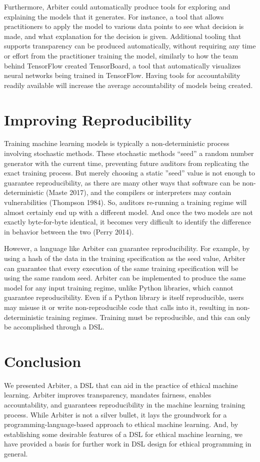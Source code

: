 \documentclass[letterpaper]{article}
\begin{document}
Furthermore, Arbiter could automatically produce tools for exploring and explaining the models that it generates. For instance, a tool that allows practitioners to apply the model to various data points to see what decision is made, and what explanation for the decision is given. Additional tooling that supports transparency can be produced automatically, without requiring any time or effort from the practitioner training the model, similarly to how the team behind TensorFlow created TensorBoard, a tool that automatically visualizes neural networks being trained in TensorFlow. Having tools for accountability readily available will increase the average accountability of models being created.

\section{Improving Reproducibility}
Training machine learning models is typically a non-deterministic process involving stochastic methods. These stochastic methods ``seed” a random number generator with the current time, preventing future auditors from replicating the exact training process. But merely choosing a static ''seed” value is not enough to guarantee reproducibility, as there are many other ways that software can be non-deterministic (Maste 2017), and the compilers or interpreters may contain vulnerabilities (Thompson 1984). So, auditors re-running a training regime will almost certainly end up with a different model. And once the two models are not exactly byte-for-byte identical, it becomes very difficult to identify the difference in behavior between the two (Perry 2014).

However, a language like Arbiter can guarantee reproducibility. For example, by using a hash of the data in the training specification as the seed value, Arbiter can guarantee that every execution of the same training specification will be using the same random seed. Arbiter can be implemented to produce the same model for any input training regime, unlike Python libraries, which cannot guarantee reproducibility. Even if a Python library is itself reproducible, users may misuse it or write non-reproducible code that calls into it, resulting in non-deterministic training regimes. Training must be reproducible, and this can only be accomplished through a DSL.

\section{Conclusion}
We presented Arbiter, a DSL that can aid in the practice of ethical machine learning. Arbiter improves transparency, mandates fairness, enables accountability, and guarantees reproducibility in the machine learning training process. While Arbiter is not a silver bullet, it lays the groundwork for a programming-language-based approach to ethical machine learning. And, by establishing some desirable features of a DSL for ethical machine learning, we have provided a basis for further work in DSL design for ethical programming in general. 



\end{document}
